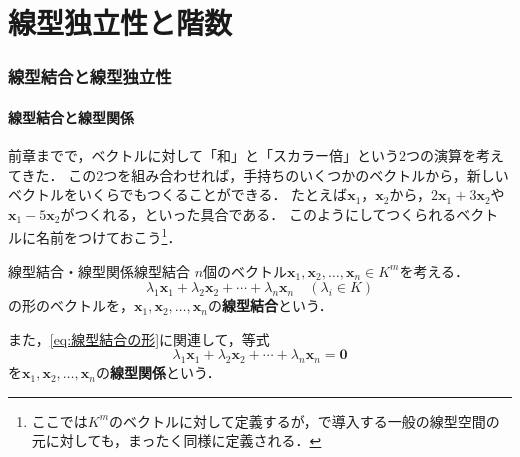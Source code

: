 \part{線型独立性と階数}

\begin{abstract}
この章では，ベクトルの組の「無駄のなさ」を測る概念を整理する．
まず\textbf{線型結合}と線型関係を定義し，線型写像が線型結合を保つことを確かめる．
次に，\textbf{線型独立}と\textbf{線型従属}を定義し，その言い換えと，以後くり返し用いる「線型独立な組の拡大」「取替補題」を扱う．
最後に，行列の\textbf{階数}を線型独立な列の最大個数として定義し，行階数と列階数の一致，行基本変形による階数の計算法，そして連立一次方程式が解をもつための条件を見る．
\end{abstract}

\section{線型結合と線型独立性}

\subsection{線型結合と線型関係}

前章までで，ベクトルに対して「和」と「スカラー倍」という$2$つの演算を考えてきた．
この$2$つを組み合わせれば，手持ちのいくつかのベクトルから，新しいベクトルをいくらでもつくることができる．
たとえば$\bm{x}_1$，$\bm{x}_2$から，$2\bm{x}_1 + 3\bm{x}_2$や$\bm{x}_1 - 5\bm{x}_2$がつくれる，といった具合である．
このようにしてつくられるベクトルに名前をつけておこう\footnote{ここでは$K^m$のベクトルに対して定義するが，で導入する一般の線型空間の元に対しても，まったく同様に定義される．}．

\begin{definition}{線型結合・線型関係}{線型結合}
  $n$個のベクトル$\bm{x}_1, \bm{x}_2, \dots, \bm{x}_n \in K^m$を考える．
  \begin{equation}
    \lambda_1 \bm{x}_1 + \lambda_2 \bm{x}_2 + \cdots + \lambda_n \bm{x}_n
    \quad (\lambda_i \in K) \label{eq:線型結合の形}
  \end{equation}
  の形のベクトルを，$\bm{x}_1, \bm{x}_2, \dots, \bm{x}_n$の\textbf{線型結合}という．

  また，\eqref{eq:線型結合の形}に関連して，等式
  \[
    \lambda_1 \bm{x}_1 + \lambda_2 \bm{x}_2 + \cdots + \lambda_n \bm{x}_n = \bm{0}
  \]
  を$\bm{x}_1, \bm{x}_2, \dots, \bm{x}_n$の\textbf{線型関係}という．
\end{definition}


